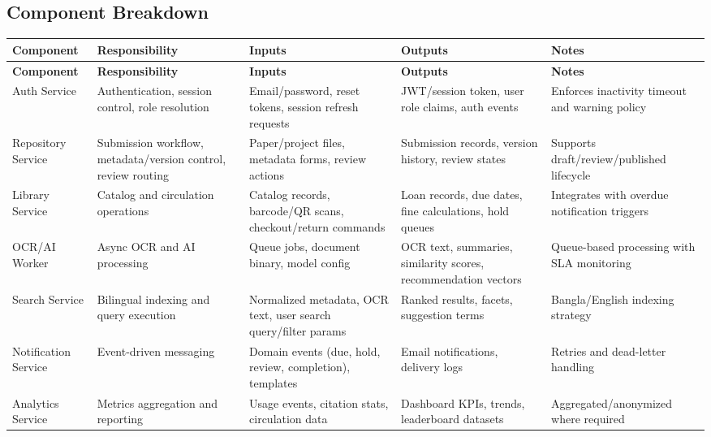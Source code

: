 \documentclass[12pt,a4paper]{article}
\begin{document}
\subsection{Component Breakdown}
\renewcommand{\arraystretch}{1.18}
\setlength{\tabcolsep}{3.5pt}
\small
\begin{longtable}{>{\raggedright\arraybackslash}p{2.1cm} >{\raggedright\arraybackslash}p{3.0cm} >{\raggedright\arraybackslash}p{2.8cm} >{\raggedright\arraybackslash}p{2.8cm} >{\raggedright\arraybackslash}p{4.0cm}}
    \toprule
    \textbf{Component} & \textbf{Responsibility} & \textbf{Inputs} & \textbf{Outputs} & \textbf{Notes} \\
    \midrule
    \endfirsthead
    \toprule
    \textbf{Component} & \textbf{Responsibility} & \textbf{Inputs} & \textbf{Outputs} & \textbf{Notes} \\
    \midrule
    \endhead
    Auth Service & Authentication, session control, role resolution & Email/password, reset tokens, session refresh requests & JWT/session token, user role claims, auth events & Enforces inactivity timeout and warning policy \\
    Repository Service & Submission workflow, metadata/version control, review routing & Paper/project files, metadata forms, review actions & Submission records, version history, review states & Supports draft/review/published lifecycle \\
    Library Service & Catalog and circulation operations & Catalog records, barcode/QR scans, checkout/return commands & Loan records, due dates, fine calculations, hold queues & Integrates with overdue notification triggers \\
    OCR/AI Worker & Async OCR and AI processing & Queue jobs, document binary, model config & OCR text, summaries, similarity scores, recommendation vectors & Queue-based processing with SLA monitoring \\
    Search Service & Bilingual indexing and query execution & Normalized metadata, OCR text, user search query/filter params & Ranked results, facets, suggestion terms & Bangla/English indexing strategy \\
    Notification Service & Event-driven messaging & Domain events (due, hold, review, completion), templates & Email notifications, delivery logs & Retries and dead-letter handling \\
    Analytics Service & Metrics aggregation and reporting & Usage events, citation stats, circulation data & Dashboard KPIs, trends, leaderboard datasets & Aggregated/anonymized where required \\

\end{longtable}
\end{document}
